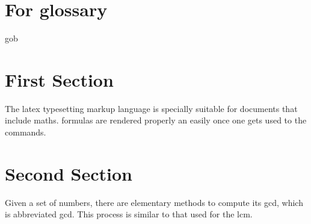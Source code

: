  \section{For glossary}
 gob
 \section{First Section}

The \Gls{latex} typesetting markup language is specially suitable for documents that include \gls{maths}. \Glspl{formula} are rendered properly an easily once one gets used to the commands.


\clearpage

\section{Second Section}

\vspace{5mm}

Given a set of numbers, there are elementary methods to compute its \acrlong{gcd}, which is abbreviated \acrshort{gcd}. This process is similar to that used for the \acrfull{lcm}.
